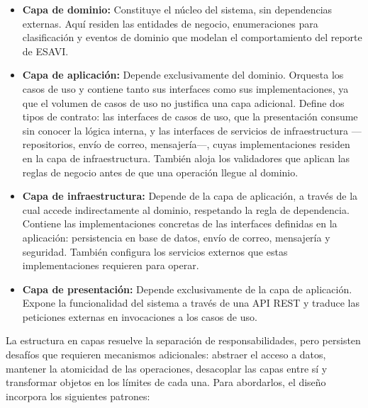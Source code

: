 \begin{itemize}
    \item \textbf{Capa de dominio:} Constituye el núcleo del sistema, sin dependencias externas. Aquí residen las entidades de negocio, enumeraciones para clasificación y eventos de dominio que modelan el comportamiento del reporte de ESAVI.
    
   \item \textbf{Capa de aplicación:} Depende exclusivamente del dominio. Orquesta los casos de uso y contiene tanto sus interfaces como sus implementaciones, ya que el volumen de casos de uso no justifica una capa adicional. Define dos tipos de contrato: las interfaces de casos de uso, que la presentación consume sin conocer la lógica interna, y las interfaces de servicios de infraestructura —repositorios, envío de correo, mensajería—, cuyas implementaciones residen en la capa de infraestructura. También aloja los validadores que aplican las reglas de negocio antes de que una operación llegue al dominio.
   
   \item \textbf{Capa de infraestructura:} Depende de la capa de aplicación, a través de la cual accede indirectamente al dominio, respetando la regla de dependencia. Contiene las implementaciones concretas de las interfaces definidas en la aplicación: persistencia en base de datos, envío de correo, mensajería y seguridad. También configura los servicios externos que estas implementaciones requieren para operar.
   
    \item \textbf{Capa de presentación:} Depende exclusivamente de la capa de aplicación. Expone la funcionalidad del sistema a través de una API REST y traduce las peticiones externas en invocaciones a los casos de uso.
\end{itemize}

La estructura en capas resuelve la separación de responsabilidades, pero persisten desafíos que requieren mecanismos adicionales: abstraer el acceso a datos, mantener la atomicidad de las operaciones, desacoplar las capas entre sí y transformar objetos en los límites de cada una. Para abordarlos, el diseño incorpora los siguientes patrones:


